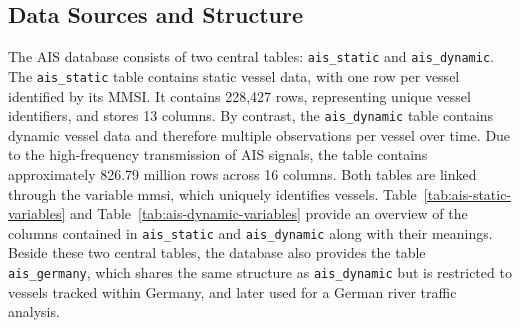 \documentclass[10pt,a4paper]{article}
\begin{document}
\subsection{Data Sources and Structure}

The AIS database consists of two central tables: \texttt{ais\_static} and \texttt{ais\_dynamic}. The \texttt{ais\_static} table
contains static vessel data, with one row per vessel identified by its MMSI. It contains 228,427 rows, representing unique vessel 
identifiers, and stores 13 columns. By contrast, the \texttt{ais\_dynamic} table contains dynamic vessel data and therefore multiple
observations per vessel over time. Due to the high-frequency transmission of AIS signals, the table contains approximately 826.79 million 
rows across 16 columns. Both tables are linked through the variable mmsi, which uniquely identifies vessels.
Table~\ref{tab:ais-static-variables} and Table~\ref{tab:ais-dynamic-variables} provide an overview of the columns contained in \texttt{ais\_static} and \texttt{ais\_dynamic} along with their meanings.
Beside these two central tables, the database also provides the table \texttt{ais\_germany}, which shares the same structure as \texttt{ais\_dynamic} 
but is restricted to vessels tracked within Germany, and later used for a German river traffic analysis.
\end{document}
